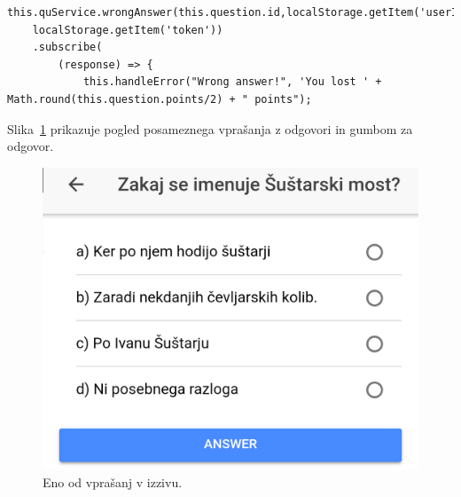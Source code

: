 \documentclass[a4paper, 12pt]{book}
\begin{document}
\begin{lstlisting}
this.quService.wrongAnswer(this.question.id,localStorage.getItem('userId'),
	localStorage.getItem('token'))
    .subscribe(
    	(response) => {
            this.handleError("Wrong answer!", 'You lost ' + Math.round(this.question.points/2) + " points");
\end{lstlisting}
Slika~\ref{question} prikazuje pogled posameznega vprašanja z odgovori in gumbom za odgovor.
\begin{figure}[H]
\centering
\includegraphics[height=0.5\textwidth]{slike/question}
\caption{Eno od vprašanj v izzivu.}\label{question}
\end{figure}
\end{document}
